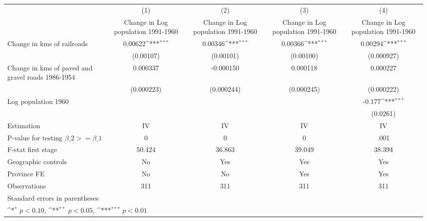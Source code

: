 {
\def\sym#1{\ifmmode^{#1}\else\(^{#1}\)\fi}
\begin{tabular}{l*{4}{c}}
\hline\hline
                &\multicolumn{1}{c}{(1)}&\multicolumn{1}{c}{(2)}&\multicolumn{1}{c}{(3)}&\multicolumn{1}{c}{(4)}\\
                &\multicolumn{1}{c}{Change in Log population 1991-1960}&\multicolumn{1}{c}{Change in Log population 1991-1960}&\multicolumn{1}{c}{Change in Log population 1991-1960}&\multicolumn{1}{c}{Change in Log population 1991-1960}\\
\hline
Change in kms of railroads&  0.00622\sym{***}&  0.00346\sym{***}&  0.00366\sym{***}&  0.00294\sym{***}\\
                &(0.00107)         &(0.00101)         &(0.00100)         &(0.000927)         \\
[1em]
Change in kms of paved and gravel roads 1986-1954& 0.000337         &-0.000150         & 0.000118         & 0.000227         \\
                &(0.000223)         &(0.000244)         &(0.000245)         &(0.000222)         \\
[1em]
Log population 1960&                  &                  &                  &   -0.177\sym{***}\\
                &                  &                  &                  & (0.0261)         \\
\hline
Estimation      &       IV         &       IV         &       IV         &       IV         \\
P-value for testing $\beta\_2 >= \beta\_1$&        0         &        0         &        0         &     .001         \\
F-stat first stage&   50.424         &   36.863         &   39.049         &   38.394         \\
Geographic controls&       No         &      Yes         &      Yes         &      Yes         \\
Province FE     &       No         &       No         &      Yes         &      Yes         \\
Observations    &      311         &      311         &      311         &      311         \\
\hline\hline
\multicolumn{5}{l}{\footnotesize Standard errors in parentheses}\\
\multicolumn{5}{l}{\footnotesize \sym{*} \(p<0.10\), \sym{**} \(p<0.05\), \sym{***} \(p<0.01\)}\\
\end{tabular}
}
